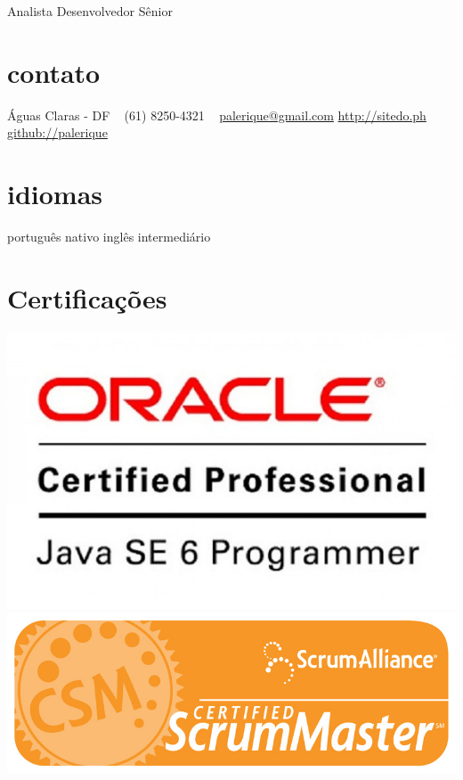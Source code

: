 
       {Analista Desenvolvedor Sênior}


\begin{aside}
  \section{contato}
    Águas Claras - DF
    ~
    (61) 8250-4321
    ~
    \href{mailto:palerique@gmail.com}{palerique@gmail.com}
    \href{http://sitedo.ph}{http://sitedo.ph}
    \href{http://github.com/palerique/}{github://palerique}
  \section{idiomas}
    português nativo
    inglês intermediário
  \section{Certificações}
    \includegraphics[scale=0.13]{ocpjp.jpg}
    \includegraphics[scale=0.13]{csm.png}
\end{aside}

